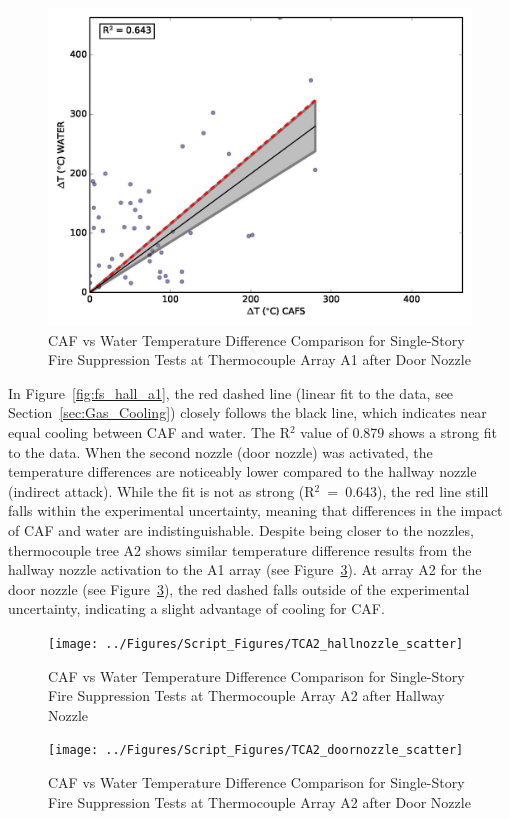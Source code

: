\documentclass[12pt,oneside]{book}
\begin{document}
\begin{figure}[!ht]
	\includegraphics[width=.7\columnwidth]{../Figures/Script_Figures/TCA1_doornozzle_scatter}
	\caption{CAF vs Water Temperature Difference Comparison for Single-Story Fire Suppression Tests at Thermocouple Array A1 after Door Nozzle}
	\label{fig:fs_door_a1}
\end{figure}

In Figure~\ref{fig:fs_hall_a1}, the red dashed line (linear fit to the data, see Section~\ref{sec:Gas_Cooling}) closely follows the black line, which indicates near equal cooling between CAF and water. The R$^2$ value of 0.879 shows a strong fit to the data. When the second nozzle (door nozzle) was activated, the temperature differences are noticeably lower compared to the hallway nozzle (indirect attack). While the fit is not as strong (R$^2$~=~0.643), the red line still falls within the experimental uncertainty, meaning that differences in the impact of CAF and water are indistinguishable. Despite being closer to the nozzles, thermocouple tree A2 shows similar temperature difference results from the hallway nozzle activation to the A1 array (see Figure~\ref{fig:fs_door_a2}). At array A2 for the door nozzle (see Figure~\ref{fig:fs_door_a2}), the red dashed falls outside of the experimental uncertainty, indicating a slight advantage of cooling for CAF.

\begin{figure}[!ht]
	\texttt{[image: ../Figures/Script\_Figures/TCA2\_hallnozzle\_scatter]}
	\caption{CAF vs Water Temperature Difference Comparison for Single-Story Fire Suppression Tests at Thermocouple Array A2 after Hallway Nozzle}
	\label{fig:fs_hall_a2}
\end{figure}

\begin{figure}[!ht]
	\texttt{[image: ../Figures/Script\_Figures/TCA2\_doornozzle\_scatter]}
	\caption{CAF vs Water Temperature Difference Comparison for Single-Story Fire Suppression Tests at Thermocouple Array A2 after Door Nozzle}
	\label{fig:fs_door_a2}
\end{figure}
\end{document}
